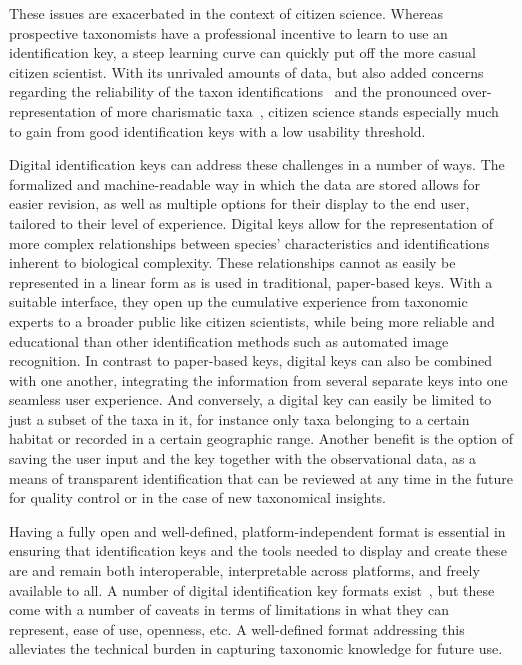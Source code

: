 \documentclass[10pt,letterpaper]{article}
\begin{document}
These issues are exacerbated in the context of citizen science. Whereas prospective taxonomists have a professional incentive to learn to use an identification key, a steep learning curve can quickly put off the more casual citizen scientist. With its unrivaled amounts of data, but also added concerns regarding the reliability of the taxon identifications~\cite{Crall2011,Burgess2017} and the pronounced over-representation of more charismatic taxa~\cite{Callaghan2020,Bayraktarov2019,Boakes2016}, citizen science stands especially much to gain from good identification keys with a low usability threshold.

Digital identification keys can address these challenges in a number of ways. The formalized and machine-readable way in which the data are stored allows for easier revision, as well as multiple options for their display to the end user, tailored to their level of experience. Digital keys allow for the representation of more complex relationships between species' characteristics and identifications inherent to biological complexity. These relationships cannot as easily be represented in a linear form as is used in traditional, paper-based keys. With a suitable interface, they open up the cumulative experience from taxonomic experts to a broader public like citizen scientists, while being more reliable and educational than other identification methods such as automated image recognition. In contrast to paper-based keys, digital keys can also be combined with one another, integrating the information from several separate keys into one seamless user experience. And conversely, a digital key can easily be limited to just a subset of the taxa in it, for instance only taxa belonging to a certain habitat or recorded in a certain geographic range. Another benefit is the option of saving the user input and the key together with the observational data, as a means of transparent identification that can be reviewed at any time in the future for quality control or in the case of new taxonomical insights.

Having a fully open and well-defined, platform-independent format is essential in ensuring that identification keys and the tools needed to display and create these are and remain both interoperable, interpretable across platforms, and freely available to all. A number of digital identification key formats exist~\cite{Dallwitz1980, Lucid}, but these come with a number of caveats in terms of limitations in what they can represent, ease of use, openness, etc. A well-defined format addressing this alleviates the technical burden in capturing taxonomic knowledge for future use.
\end{document}

